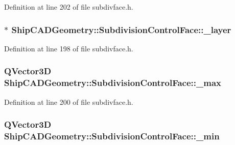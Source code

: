 Definition at line 202 of file subdivface.\-h.

\hypertarget{classShipCADGeometry_1_1SubdivisionControlFace_a83e0b0518f2206f2ceccf1e9e9894f8d}{
\subsubsection[{\-\_\-layer}]{$\ast$ Ship\-C\-A\-D\-Geometry\-::\-Subdivision\-Control\-Face\-::\-\_\-layer\hspace{0.3cm}{\ttfamily [protected]}}}\label{classShipCADGeometry_1_1SubdivisionControlFace_a83e0b0518f2206f2ceccf1e9e9894f8d}


Definition at line 198 of file subdivface.\-h.

\hypertarget{classShipCADGeometry_1_1SubdivisionControlFace_ada4bdde0addfa469e49a36d1ac99bf00}{
\subsubsection[{\-\_\-max}]{\setlength{\rightskip}{0pt plus 5cm}Q\-Vector3\-D Ship\-C\-A\-D\-Geometry\-::\-Subdivision\-Control\-Face\-::\-\_\-max\hspace{0.3cm}{\ttfamily [protected]}}}\label{classShipCADGeometry_1_1SubdivisionControlFace_ada4bdde0addfa469e49a36d1ac99bf00}


Definition at line 200 of file subdivface.\-h.

\hypertarget{classShipCADGeometry_1_1SubdivisionControlFace_abc8afda2435ea3e2b8f7d66e04eede3d}{
\subsubsection[{\-\_\-min}]{\setlength{\rightskip}{0pt plus 5cm}Q\-Vector3\-D Ship\-C\-A\-D\-Geometry\-::\-Subdivision\-Control\-Face\-::\-\_\-min\hspace{0.3cm}{\ttfamily [protected]}}}\label{classShipCADGeometry_1_1SubdivisionControlFace_abc8afda2435ea3e2b8f7d66e04eede3d}


